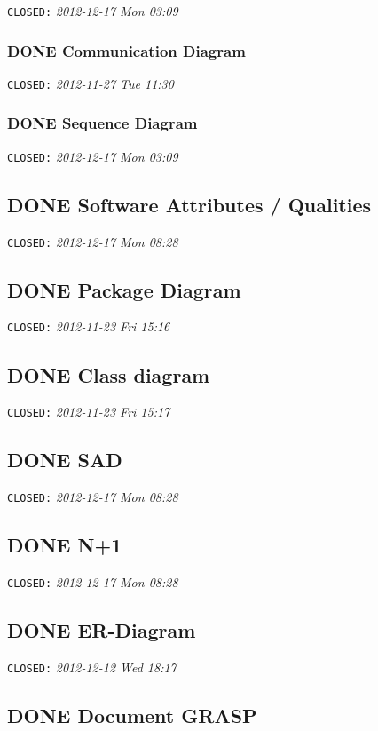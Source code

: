 \documentclass[11pt]{article}
\begin{document}
   \texttt{CLOSED:} \textit{2012-12-17 Mon 03:09}
\subsubsection{\textbf{DONE} Communication Diagram}
\label{sec-1-9-1}

    \texttt{CLOSED:} \textit{2012-11-27 Tue 11:30}
\subsubsection{\textbf{DONE} Sequence Diagram}
\label{sec-1-9-2}

    \texttt{CLOSED:} \textit{2012-12-17 Mon 03:09}
\subsection{\textbf{DONE} Software Attributes / Qualities}
\label{sec-1-10}

   \texttt{CLOSED:} \textit{2012-12-17 Mon 08:28}
\subsection{\textbf{DONE} Package Diagram}
\label{sec-1-11}

   \texttt{CLOSED:} \textit{2012-11-23 Fri 15:16}
\subsection{\textbf{DONE} Class diagram}
\label{sec-1-12}

   \texttt{CLOSED:} \textit{2012-11-23 Fri 15:17}
\subsection{\textbf{DONE} SAD}
\label{sec-1-13}

   \texttt{CLOSED:} \textit{2012-12-17 Mon 08:28}
\subsection{\textbf{DONE} N+1}
\label{sec-1-14}

   \texttt{CLOSED:} \textit{2012-12-17 Mon 08:28}
\subsection{\textbf{DONE} ER-Diagram}
\label{sec-1-15}

   \texttt{CLOSED:} \textit{2012-12-12 Wed 18:17}
\subsection{\textbf{DONE} Document GRASP}
\label{sec-1-16}
\end{document}
